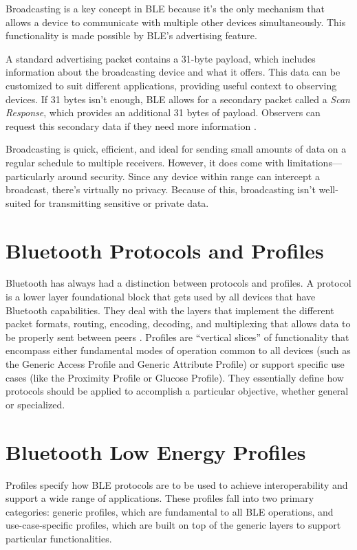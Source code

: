 Broadcasting is a key concept in BLE because it’s the only mechanism that allows a device to communicate with multiple other devices simultaneously. This functionality is made possible by BLE’s advertising feature.

A standard advertising packet contains a 31-byte payload, which includes information about the broadcasting device and what it offers. This data can be customized to suit different applications, providing useful context to observing devices. If 31 bytes isn’t enough, BLE allows for a secondary packet called a \textit{Scan Response}, which provides an additional 31 bytes of payload. Observers can request this secondary data if they need more information \cite{gettingstartedwble}.

Broadcasting is quick, efficient, and ideal for sending small amounts of data on a regular schedule to multiple receivers. However, it does come with limitations—particularly around security. Since any device within range can intercept a broadcast, there’s virtually no privacy. Because of this, broadcasting isn’t well-suited for transmitting sensitive or private data.
\section{Bluetooth Protocols and Profiles}

Bluetooth has always had a distinction between protocols and profiles. A protocol is a lower layer foundational block that gets used by all devices that have Bluetooth capabilities. They deal with the layers that implement the different packet formats, routing, encoding, decoding, and multiplexing that allows data to be properly sent between peers \cite{gettingstartedwble}. Profiles are ``vertical slices'' of functionality that encompass either fundamental modes of operation common to all devices (such as the Generic Access Profile and Generic Attribute Profile) or support specific use cases (like the Proximity Profile or Glucose Profile). They essentially define how protocols should be applied to accomplish a particular objective, whether general or specialized.

\section{Bluetooth Low Energy Profiles}

Profiles specify how BLE protocols are to be used to achieve interoperability and support a wide range of applications. These profiles fall into two primary categories: generic profiles, which are fundamental to all BLE operations, and use-case-specific profiles, which are built on top of the generic layers to support particular functionalities.

